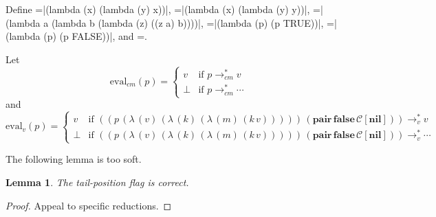 \documentclass[ms,electronic,twosidetoc,letterpaper,chaptercenter,parttop]{byumsphd}
\begin{document}


Define =\scheme|(lambda (x) (lambda (y) x))|, =\scheme|(lambda
(x) (lambda (y) y))|, =\scheme|(lambda a (lambda b (lambda (z) ((z a) b))))|,
=\scheme|(lambda (p) (p TRUE))|, =\scheme|(lambda (p) (p FALSE))|,
and =.

Let
\[
\mathrm{eval}_{cm}(p)=\begin{cases}
v     &\text{if $p\rightarrow_{cm}^{*}v$}\\
\perp &\text{if $p\rightarrow_{cm}^{*}\cdots$}
\end{cases}
\]
and
\[
\mathrm{eval}_{v}(p)=\begin{cases}
v     &\text{if $((p\,(\lambda\,(v)\,(\lambda\,(k)\,(\lambda\,(m)\,(k\,v)))))\,(\textbf{pair}\,\textbf{false}\,\mathcal{C}[\textbf{nil}]))\rightarrow_{v}^{*}v$}\\
\perp &\text{if $((p\,(\lambda\,(v)\,(\lambda\,(k)\,(\lambda\,(m)\,(k\,v)))))\,(\textbf{pair}\,\textbf{false}\,\mathcal{C}[\textbf{nil}]))\rightarrow_{v}^{*}\cdots$}
\end{cases}
\]


\newtheorem{lemma}{Lemma}
\newtheorem{theorem}{Theorem}
\newtheorem{case}{Case}

The following lemma is too soft.
\begin{lemma}
The tail-position flag is correct.
\end{lemma}

\begin{proof}
Appeal to specific reductions.
\end{proof}
\end{document}
